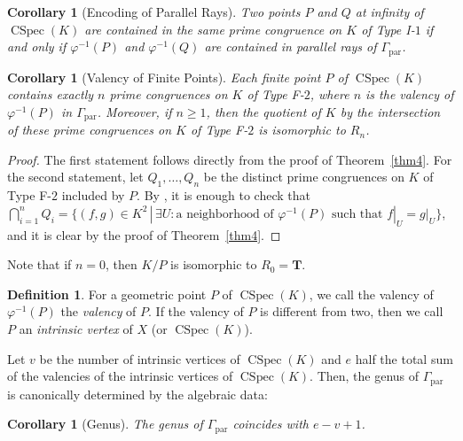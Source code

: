 \documentclass[a4paper,12pt]{amsart}
\theoremstyle{plain}
\newtheorem{corollary}[theorem]{Corollary}
\theoremstyle{definition}
\newtheorem{definition}[theorem]{Definition}
\begin{document}
\begin{corollary}[Encoding of Parallel Rays]
    \label{cor4}
Two points $P$ and $Q$ at infinity of $\operatorname{CSpec}(K)$ are contained in the same prime congruence on $K$ of Type I-$1$ if and only if $\varphi^{-1}(P)$ and $\varphi^{-1}(Q)$ are contained in parallel rays of $\varGamma_{\operatorname{par}}$.
\end{corollary}

\begin{corollary}[Valency of Finite Points]
    \label{cor5}
Each finite point $P$ of $\operatorname{CSpec}(K)$ contains exactly $n$ prime congruences on $K$ of Type F-$2$, where $n$ is the valency of $\varphi^{-1}(P)$ in $\varGamma_{\operatorname{par}}$.
Moreover, if $n \ge 1$, then the quotient of $K$ by the intersection of these prime congruences on $K$ of Type F-$2$ is isomorphic to $R_n$.
\end{corollary}

\begin{proof}
The first statement follows directly from the proof of Theorem~\ref{thm4}.
For the second statement, let $Q_1, \ldots, Q_n$ be the distinct prime congruences on $K$ of Type F-$2$ included by $P$.
By \cite[Propositions~4.41 and 4.42]{JuAe7}, it is enough to check that $\bigcap_{i = 1}^n Q_i = \{ (f, g) \in K^2 \,|\, \exists U: \text{a neighborhood of }\varphi^{-1}(P) \text{ such that } f|_U = g|_U \}$, and it is clear by the proof of Theorem~\ref{thm4}.
\end{proof}

Note that if $n = 0$, then $K / P$ is isomorphic to $R_0 = \boldsymbol{T}$.

\begin{definition}
    \label{dfn5}
For a geometric point $P$ of $\operatorname{CSpec}(K)$, we call the valency of $\varphi^{-1}(P)$ the \textit{valency} of $P$.
If the valency of $P$ is different from two, then we call $P$ an \textit{intrinsic vertex} of $X$ (or $\operatorname{CSpec}(K)$).
\end{definition}

Let $v$ be the number of intrinsic vertices of $\operatorname{CSpec}(K)$ and $e$ half the total sum of the valencies of the intrinsic vertices of $\operatorname{CSpec}(K)$.
Then, the genus of $\varGamma_{\operatorname{par}}$ is canonically determined by the algebraic data:

\begin{corollary}[Genus]
    \label{cor6}
The genus of $\varGamma_{\operatorname{par}}$ coincides with $e - v + 1$.
\end{corollary}
\end{document}
